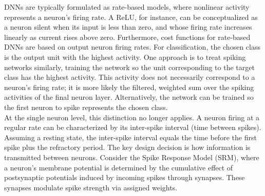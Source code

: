\noindent DNNs are typically formulated as rate-based models, where nonlinear activity represents a neuron's firing rate. A ReLU, for instance, can be conceptualized as a neuron silent when its input is less than zero, and whose firing rate increases linearly as current rises above zero. Furthermore, cost functions for rate-based DNNs are based on output neuron firing rates. For classification, the chosen class is the output unit with the highest activity. One approach is to treat spiking networks similarly, training the network so the unit corresponding to the target class has the highest activity. This activity does not necessarily correspond to a neuron's firing rate; it is more likely the filtered, weighted sum over the spiking activities of the final neuron layer. Alternatively, the network can be trained so the first neuron to spike represents the chosen class.\\


\noindent At the single neuron level, this distinction no longer applies. A neuron firing at a regular rate can be characterized by its inter-spike interval (time between spikes). Assuming a resting state, the inter-spike interval equals the time before the first spike plus the refractory period. The key design decision is how information is transmitted between neurons. Consider the Spike Response Model (SRM), where a neuron's membrane potential is determined by the cumulative effect of postsynaptic potentials induced by incoming spikes through synapses. These synapses modulate spike strength via assigned weights.\\

